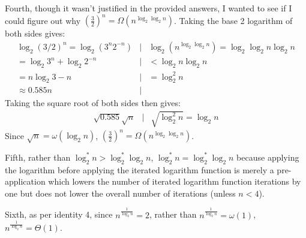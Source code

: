 Fourth, though it wasn't justified in the provided answers, I wanted to see if I could figure out why $\left ( \frac{3}{2} \right )^n = \Omega(n^{\log_2 \log_2 n})$.  Taking the base 2 logarithm of both sides gives:
\begin{eqnarray*}
	\log_2 (3/2)^n = \log_2 (3^n 2^{-n})	&|& \log_2 ( n^{\log_2 \log_2 n} ) = \log_2 \log_2 n \log_2 n \\
	= \log_2 3^n + \log_2 2^{-n} 		&|& < \log_2 n \log_2 n \\
	= n\log_2 3 - n				&|& = \log_2^2 n \\
	\approx 0.585n				&|&
\end{eqnarray*}
Taking the square root of both sides then gives:
\begin{eqnarray*}
	\sqrt{0.585} \sqrt{n} 			&|& \sqrt{\log_2^2 n} = \log_2 n
\end{eqnarray*}
Since $\sqrt{n} = \omega (\log_2 n)$, $\left ( \frac{3}{2} \right )^n = \Omega (n^{\log_2 \log_2 n})$.

Fifth, rather than $\log_2^* n > \log_2^* \log_2 n$, $\log_2^* n = \log_2^* \log_2 n$ because applying the logarithm before applying the iterated logarithm function is merely a pre-application which lowers the number of iterated logarithm function iterations by one but does not lower the overall number of iterations (unless $n < 4$).

Sixth, as per identity 4, since $n^{\frac{1}{\log_2 n}} = 2$, rather than $n^{\frac{1}{\log_2 n}} = \omega(1)$, $n^{\frac{1}{\log_2 n}} = \Theta (1)$.
